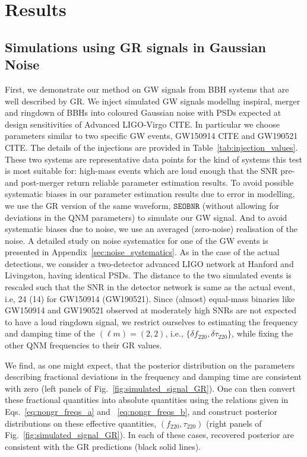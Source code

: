\documentclass[twocolumn,prd,superscriptaddress,amsfonts,amssymb,amsmath,preprintnumbers]{revtex4-1}
\newcommand{\df}[1]{\delta f_{\text{#1}}}
\newcommand{\dtau}[1]{\delta \tau_{\text{#1}}}
\newcommand{\fngr}[1]{f_{\text{#1}}}
\newcommand{\taungr}[1]{\tau_{\text{#1}}}
\newcommand{\SEOB}{\texttt{SEOBNR}}
\begin{document}
\section{Results}\label{sec:results}

\subsection{Simulations using GR signals in Gaussian Noise}\label{ssec:gr_signal}

First, we demonstrate our method on GW signals from BBH systems that are well described by GR. We inject simulated GW signals modellng inspiral, merger and ringdown of BBHs into coloured Gaussian noise with PSDs expected at design sensitivities of Advanced LIGO-Virgo CITE. In particular we choose parameters similar to two specific GW events, GW150914 CITE and GW190521 CITE. The details of the injections are provided in Table~\ref{tab:injection_values}. These two systems are representative data points for the kind of systems this test is most suitable for: high-mass events which are loud enough that the SNR pre- and post-merger return reliable parameter estimation results. To avoid possible systematic biases in our parameter estimation results due to error in modelling, we use the GR version of the same waveform, $\SEOB$ (without allowing for deviations in the QNM parameters) to simulate our GW signal. And to avoid systematic biases due to noise, we use an averaged (zero-noise) realisation of the noise. A detailed study on noise systematics for one of the GW events is presented in Appendix~\ref{sec:noise_systematics}. As in the case of the actual detections, we consider a two-detector advanced LIGO network at Hanford and Livingston, having identical PSDs. The distance to the two simulated events is rescaled such that the SNR in the detector network is same as the actual event, i.e, 24 (14) for GW150914 (GW190521). Since (almost) equal-mass binaries like GW150914 and GW190521 observed at moderately high SNRs are not expected to have a loud ringdown signal, we restrict ourselves to estimating the frequency and damping time of the $(\ell m) = (2,2)$, i.e., $\{\df{220},\dtau{220}\}$, while fixing the other QNM frequencies to their GR values. 

We find, as one might expect, that the posterior distribution on the parameters describing fractional deviations in the frequency and damping time are consistent with zero (left panels of Fig.~\ref{fig:simulated_signal_GR}). One can then convert these fractional quantities into absolute quantities using the relations given in Eqs.~\ref{eq:nongr_freqs_a} and ~\ref{eq:nongr_freqs_b}, and construct posterior distributions on these effective quantities, $(\fngr{220}, \taungr{220})$ (right panels of Fig.~\ref{fig:simulated_signal_GR}). In each of these cases, recovered posterior are consistent with the GR predictions (black solid lines).
\end{document}
